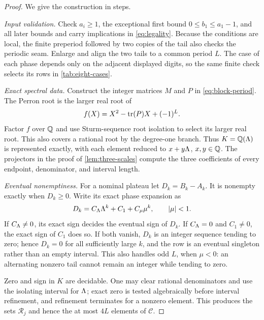 \begin{proof}
We give the construction in steps.

\smallskip
\noindent\emph{Input validation.}
Check $a_i\geq1$, the exceptional first bound $0\leq b_1\leq a_1-1$, and
all later bounds and carry implications in \eqref{eq:legality}.  Because the
conditions are local, the finite preperiod followed by two copies of the tail
also checks the periodic seam.  Enlarge and align the two tails to a common
period $L$.  The case of each phase depends only on the adjacent displayed
digits, so the same finite check selects its rows in \cref{tab:eight-cases}.

\smallskip
\noindent\emph{Exact spectral data.}
Construct the integer matrices $M$ and $P$ in
\eqref{eq:block-period}.  The Perron root is the larger real root of
\begin{equation}
 f(X)=X^2-\operatorname{tr}(P)X+(-1)^L.
 \label{eq:perron-polynomial}
\end{equation}
Factor $f$ over $\mathbb{Q}$ and use Sturm-sequence root isolation to select its larger
real root.  This also covers a rational root by the degree-one branch.  Thus
$K=\mathbb{Q}(\Lambda)$ is represented exactly, with each element reduced to
$x+y\Lambda$, $x,y\in\mathbb{Q}$.  The projectors in the proof of
\cref{lem:three-scales} compute the three coefficients of every endpoint,
denominator, and interval length.

\smallskip
\noindent\emph{Eventual nonemptiness.}
For a nominal plateau let $D_k=B_k-A_k$.  It is nonempty exactly when
$D_k\geq0$.  Write its exact phase expansion as
\begin{equation}
 D_k=C_\Lambda\Lambda^k+C_1+C_\mu\mu^k,
 \qquad |\mu|<1.
 \label{eq:length-expansion}
\end{equation}
If $C_\Lambda\ne0$, its exact sign decides the eventual sign of $D_k$.  If
$C_\Lambda=0$ and $C_1\ne0$, the exact sign of $C_1$ does so.  If both vanish,
$D_k$ is an integer sequence tending to zero; hence $D_k=0$ for all
sufficiently large $k$, and the row is an eventual singleton rather than an
empty interval.  This also handles odd $L$, when $\mu<0$: an alternating
nonzero tail cannot remain an integer while tending to zero.

Zero and sign in $K$ are decidable.  One may clear rational denominators and
use the isolating interval for $\Lambda$; exact zero is tested algebraically
before interval refinement, and refinement terminates for a nonzero element.
This produces the sets $\mathcal R_j$ and hence the at most $4L$ elements of
$\mathcal C$.


\end{proof}

